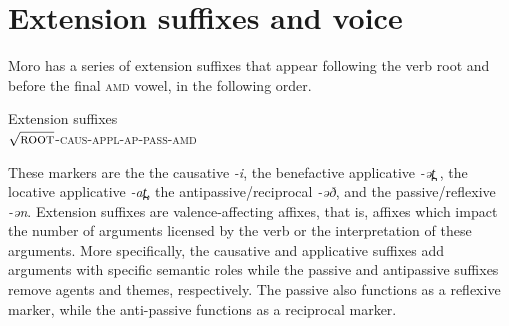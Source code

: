 %
%
%
%
%
%
%
%
%
%
%
%
%
%
%
%
%
%

\section{Extension suffixes and voice}\label{sec:ch11:extension}

Moro has a series of extension suffixes that appear following the verb root and before the final \textsc{amd} vowel, in the following order.

\ea Extension suffixes\\
$\sqrt{\textsc{root}}$-\textsc{caus-appl-ap-pass-amd}
\z 

These markers are the the causative \textit{-i}, the benefactive applicative \textit{-ət̪ },  the locative applicative \textit{-at̪}, the antipassive/reciprocal \textit{-əð}, and the passive/reflexive \textit{-ən}. Extension suffixes are valence-affecting affixes, that is, affixes which impact the number of arguments licensed by the verb or the interpretation of these arguments. More specifically, the causative and applicative suffixes add arguments with specific semantic roles while the passive and antipassive suffixes remove agents and themes, respectively. The passive also functions as a reflexive marker, while the anti-passive functions as a reciprocal marker. 

